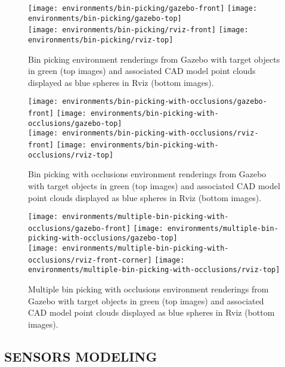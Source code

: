\begin{figure}
	\centering
	\texttt{[image: environments/bin-picking/gazebo-front]}
	\texttt{[image: environments/bin-picking/gazebo-top]}\\
	\texttt{[image: environments/bin-picking/rviz-front]}
	\texttt{[image: environments/bin-picking/rviz-top]}
	\caption{Bin picking environment renderings from Gazebo with target objects in green (top images) and associated CAD model point clouds displayed as blue spheres in Rviz (bottom images).}
	\label{fig:bin-picking-environment}
\end{figure}

\begin{figure}
	\centering
	\texttt{[image: environments/bin-picking-with-occlusions/gazebo-front]}
	\texttt{[image: environments/bin-picking-with-occlusions/gazebo-top]}\\
	\texttt{[image: environments/bin-picking-with-occlusions/rviz-front]}
	\texttt{[image: environments/bin-picking-with-occlusions/rviz-top]}
	\caption{Bin picking with occlusions environment renderings from Gazebo with target objects in green (top images) and associated CAD model point clouds displayed as blue spheres in Rviz (bottom images).}
	\label{fig:bin-picking-with-occlusions-environment}
\end{figure}

\begin{figure}
	\centering
	\texttt{[image: environments/multiple-bin-picking-with-occlusions/gazebo-front]}
	\texttt{[image: environments/multiple-bin-picking-with-occlusions/gazebo-top]}\\
	\texttt{[image: environments/multiple-bin-picking-with-occlusions/rviz-front-corner]}
	\texttt{[image: environments/multiple-bin-picking-with-occlusions/rviz-top]}
	\caption{Multiple bin picking with occlusions environment renderings from Gazebo with target objects in green (top images) and associated CAD model point clouds displayed as blue spheres in Rviz (bottom images).}
	\label{fig:multiple-bin-picking-with-occlusions-environment}
\end{figure}


\subsection{\uppercase{Sensors modeling}}

